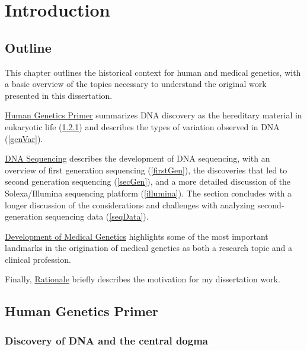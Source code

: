 \documentclass[11pt,letterpaper,oneside]{book}
\begin{document}
\mainmatter

\hypertarget{intro}{%
\chapter{Introduction}\label{intro}}

\hypertarget{outline}{%
\section{Outline}\label{outline}}

This chapter outlines the historical context for human and medical genetics, with a basic overview of the topics necessary to understand the original work presented in this dissertation.

\protect\hyperlink{humGenPrime}{Human Genetics Primer} summarizes DNA discovery as the hereditary material in eukaryotic life (\ref{dnaDiscover}) and describes the types of variation observed in DNA (\ref{genVar}).

\protect\hyperlink{sequencing}{DNA Sequencing} describes the development of DNA sequencing, with an overview of first generation sequencing (\ref{firstGen}), the discoveries that led to second generation sequencing (\ref{secGen}), and a more detailed discussion of the Solexa/Illumina sequencing platform (\ref{illumina}). The section concludes with a longer discussion of the considerations and challenges with analyzing second-generation sequencing data (\ref{seqData}).

\protect\hyperlink{medGen}{Development of Medical Genetics} highlights some of the most important landmarks in the origination of medical genetics as both a research topic and a clinical profession.

Finally, \protect\hyperlink{prob}{Rationale} briefly describes the motivation for my dissertation work.

\hypertarget{humGenPrime}{%
\section{Human Genetics Primer}\label{humGenPrime}}

\hypertarget{dnaDiscover}{%
\subsection{Discovery of DNA and the central dogma}\label{dnaDiscover}}
\end{document}
